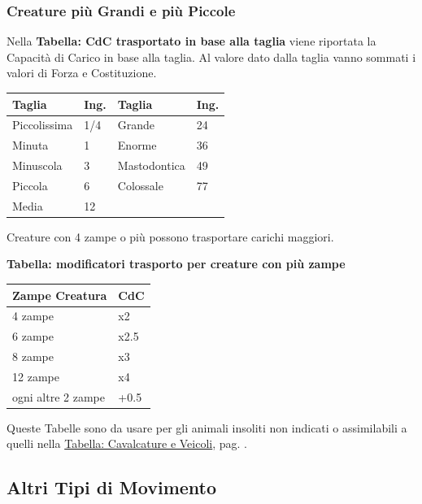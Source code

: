 \begin{multicols}{2}
\subsubsection{Creature più Grandi e più Piccole}\label{tagliaeportata}

Nella \textbf{Tabella: CdC trasportato in base alla taglia} viene riportata la Capacità di Carico in base alla taglia. Al valore dato dalla taglia vanno sommati i valori di Forza e Costituzione.

\medskip

\begin{tabularx}{0.45\textwidth}{ll|ll}
\textbf{Taglia}& \textbf{Ing.}&\textbf{Taglia} & \textbf{Ing.}\\
\toprule
Piccolissima &1/4& Grande & 24\\
Minuta & 1 & Enorme& 36\\
Minuscola & 3& Mastodontica&49\\
Piccola & 6 & Colossale&77\\
Media & 12&&
\end{tabularx}

\medskip

Creature con 4 zampe o più possono trasportare carichi maggiori.


\textbf{Tabella: modificatori trasporto per creature con più zampe}

\medskip

\begin{tabularx}{0.45\textwidth}{ll}
\textbf{Zampe Creatura}&\textbf{CdC}\\
\toprule
4 zampe & x2\\
6 zampe & x2.5\\
8 zampe & x3\\
12 zampe & x4\\
ogni altre 2 zampe & +0.5
\end{tabularx}

\medskip

Queste Tabelle sono da usare per gli animali insoliti non indicati o assimilabili a quelli nella \hyperlink{TabellaCavalcatureeVeicoli}{Tabella: Cavalcature e Veicoli}, pag. \pageref{TabellaCavalcatureeVeicoli}.

\subsection{Altri Tipi di Movimento}


\end{multicols}
